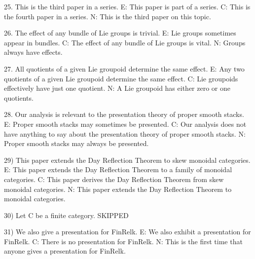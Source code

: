 25. This is the third paper in a series.
E: This paper is part of a series.
C: This is the fourth paper in a series.
N: This is the third paper on this topic.

26. The effect of any bundle of Lie groups is trivial.
E: Lie groups sometimes appear in bundles.
C: The effect of any bundle of Lie groups is vital.
N: Groups always have effects.

27.  All quotients of a given Lie groupoid determine the same effect.
E:  Any two quotients of a given Lie groupoid determine the same effect.
C: Lie groupoids effectively have just one quotient.
N: A Lie groupoid has either zero or one quotients.

28. Our analysis is relevant to the presentation theory of proper smooth stacks.
E: Proper smooth stacks may sometimes be presented.
C: Our analysis does not have anything to say about the presentation theory of proper smooth stacks.
N: Proper smooth stacks may always be presented.

29) This paper extends the Day Reflection Theorem to skew monoidal categories.
E:  This paper extends the Day Reflection Theorem to a family of monoidal categories.
C: This paper derives the Day Reflection Theorem from skew monoidal categories.
N: This paper extends the Day Reflection Theorem to monoidal categories.

30) Let C be a finite category.
SKIPPED

31) We also give a presentation for FinRelk.
E: We also exhibit a presentation for FinRelk.
C: There is no presentation for FinRelk.
N: This is the first time that anyone gives a presentation for FinRelk.

 

